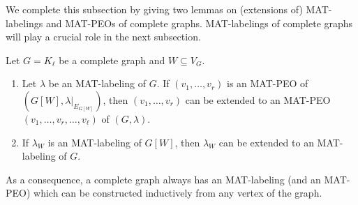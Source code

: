 \documentclass[ALCO, Unicode,published]{cedram}
\begin{document}
We complete this subsection by giving two lemmas on (extensions of) MAT-labelings and MAT-PEOs of complete graphs. 
MAT-labelings of complete graphs will play a crucial role in the next subsection. 

\begin{lemma}\label{MAT-L-PEO of complete graph}
Let $ G = K_{\ell} $ be a complete graph and $ W \subseteq V_{G} $. 
\begin{enumerate}[(1)]
\item\label{MAT-L-PEO of complete graph 1} 
Let $ \lambda $ be an MAT-labeling of $ G$. If $ (v_{1}, \dots, v_{r}) $ is an MAT-PEO  of $ (G[W], \lambda|_{E_{G[W]}}) $, then $ (v_{1}, \dots, v_{r}) $ can be extended to an MAT-PEO $ (v_{1}, \dots, v_{r}, \dots, v_{\ell}) $ of $ (G,\lambda) $. 
\item\label{MAT-L-PEO of complete graph 2} 

If $ \lambda_{W} $ is an MAT-labeling of $ G[W] $, then $ \lambda_{W} $ can be extended to an MAT-labeling of $ G $. 

\end{enumerate}
As a consequence, a complete graph always has an MAT-labeling (and an MAT-PEO) which can be constructed inductively from any vertex of the graph.
\end{lemma}
\end{document}
